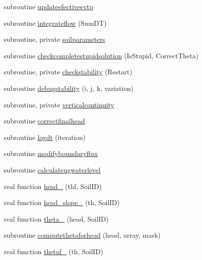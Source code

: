 \begin{DoxyCompactItemize}
subroutine \mbox{\hyperlink{namespacemoduleporousmedia_a06efe35a5a85d34f8db82ebe144c1def}{updateefectiveevtp}}
\item 
subroutine \mbox{\hyperlink{namespacemoduleporousmedia_ab03d5744de85ffec6652ff0b88896f38}{integrateflow}} (Sum\+DT)
\item 
subroutine, private \mbox{\hyperlink{namespacemoduleporousmedia_ac37dcb693dc313ce78306c5294823662}{soilparameters}}
\item 
subroutine \mbox{\hyperlink{namespacemoduleporousmedia_ae17de838533d1f706a81845e023fcec8}{checkcompletestupidsolution}} (Is\+Stupid, Correct\+Theta)
\item 
subroutine, private \mbox{\hyperlink{namespacemoduleporousmedia_a6005172f093c0d9ccafbe25e15b30383}{checkstability}} (Restart)
\item 
subroutine \mbox{\hyperlink{namespacemoduleporousmedia_ab71e22750d7cb57370aeec645454d816}{debugstability}} (i, j, k, variation)
\item 
subroutine, private \mbox{\hyperlink{namespacemoduleporousmedia_a406def0f9f49282ca709c13afe389dff}{verticalcontinuity}}
\item 
subroutine \mbox{\hyperlink{namespacemoduleporousmedia_ad5fbeb4f9729104026e34d772e57be70}{correctfinalhead}}
\item 
subroutine \mbox{\hyperlink{namespacemoduleporousmedia_aefd72c2c51be03528321ec53d37a595c}{logdt}} (iteration)
\item 
subroutine \mbox{\hyperlink{namespacemoduleporousmedia_a38214dbc89926ed05dfa7d3831f6fc5a}{modifyboundaryflux}}
\item 
subroutine \mbox{\hyperlink{namespacemoduleporousmedia_a3ba8c32bae3dfce05b772d49374e1381}{calculateugwaterlevel}}
\item 
real function \mbox{\hyperlink{namespacemoduleporousmedia_a8bee2fc4ac5baf4e997680a0b63e34b3}{head\+\_\+}} (thf, Soil\+ID)
\item 
real function \mbox{\hyperlink{namespacemoduleporousmedia_a3c4b0e307933259bb0fd3bb97624a021}{head\+\_\+slope\+\_\+}} (th, Soil\+ID)
\item 
real function \mbox{\hyperlink{namespacemoduleporousmedia_a61fe4c9d6a8bf021bfbb5ae3ba5e548e}{theta\+\_\+}} (head, Soil\+ID)
\item 
subroutine \mbox{\hyperlink{namespacemoduleporousmedia_a01d07c2251d4f4c42f4f695af824a478}{computethetaforhead}} (head, array, mask)
\item 
real function \mbox{\hyperlink{namespacemoduleporousmedia_ada12066e158a338a6444954f0da815e1}{thetaf\+\_\+}} (th, Soil\+ID)

\end{DoxyCompactItemize}
